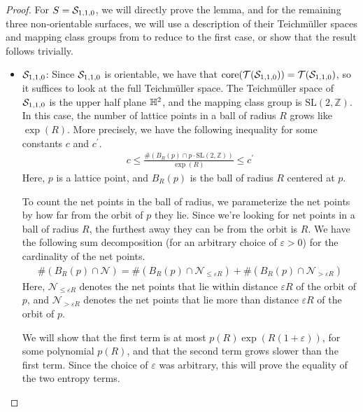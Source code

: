 \documentclass[12pt, reqno]{amsart}
\begin{document}
\begin{proof}
  For $S = \mathcal{S}_{1,1,0}$, we will directly prove the lemma, and for the remaining three non-orientable surfaces, we will use a description of their Teichmüller spaces and mapping class groups from \textcite{gendulphe2017whats} to reduce to the first case, or show that the result follows trivially.
  \begin{itemize}
  \item $\mathcal{S}_{1,1,0}$: Since $\mathcal{S}_{1,1,0}$ is orientable, we have that $\mathrm{core(\mathcal{T}(\mathcal{S}_{1,1,0}))} = \mathcal{T}(\mathcal{S}_{1,1,0})$, so it suffices to look at the full Teichmüller space.
    The Teichmüller space of $\mathcal{S}_{1,1,0}$ is the upper half plane $\mathbb{H}^2$, and the mapping class group is $\mathrm{SL}(2, \mathbb{Z})$.
    In this case, the number of lattice points in a ball of radius $R$ grows like $\exp(R)$.
    More precisely, we have the following inequality for some constants $c$ and $c^\prime$.
    \begin{align}
      c \leq \frac{\#\left( B_R(p) \cap p \cdot \mathrm{SL}(2, \mathbb{Z}) \right)}{\exp(R)} \leq c^{\prime} \label{eq:lattice-point-count}
    \end{align}
    Here, $p$ is a lattice point, and $B_R(p)$ is the ball of radius $R$ centered at $p$.

    To count the net points in the ball of radius, we parameterize the net points by how far from the orbit of $p$ they lie. Since we're looking for net points in a ball of radius $R$, the furthest away they can be from the orbit is $R$.
    We have the following sum decomposition (for an arbitrary choice of $\varepsilon > 0$) for the cardinality of the net points.
    \begin{align}
      \label{eq:net-point-decomposition-base-case}
      \#\left( B_R(p) \cap \mathcal{N} \right) = \#\left( B_R(p) \cap \mathcal{N}_{\leq \varepsilon R} \right) + \#\left( B_R(p) \cap \mathcal{N}_{> \varepsilon R} \right)
    \end{align}
    Here, $\mathcal{N}_{\leq \varepsilon R}$ denotes the net points that lie within distance $\varepsilon R$ of the orbit of $p$, and $\mathcal{N}_{> \varepsilon R}$ denotes the net points that lie more than distance $\varepsilon R$ of the orbit of $p$.

    We will show that the first term is at most $p(R) \exp(R(1 + \varepsilon))$, for some polynomial $p(R)$, and that the second term grows slower than the first term.
    Since the choice of $\varepsilon$ was arbitrary, this will prove the equality of the two entropy terms.


\end{itemize}
\end{proof}
\end{document}
